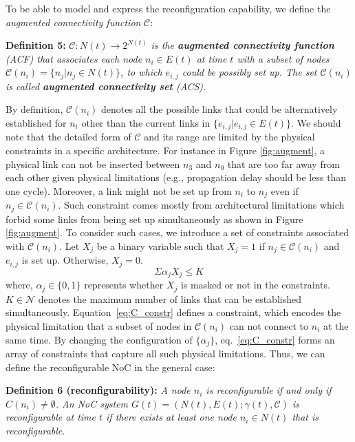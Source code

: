 {{To be able to model and express the reconfiguration capability, we define the \textit{augmented connectivity function} $\mathcal C$:

\noindent \textbf{Definition 5:} \textit{ $\mathcal C: N(t)\rightarrow 2^{N(t)} $ is the \textbf{augmented connectivity function} (ACF) that associates each node $n_{i} \in E(t)$ at time $t$ with a subset of nodes $\mathcal C(n_{i})=\{n_{j}|n_{j} \in N(t)\}$, to which $e_{i,j}$ could be possibly set up. The set $\mathcal C(n_{i})$ is called \textbf{augmented connectivity set} (ACS).}

By definition, $\mathcal C(n_{i})$ denotes all the possible links that could be alternatively established for $n_{i}$ other than the current links in $\{e_{i,j}|e_{i,j} \in E(t)\}$. We should note that the detailed form of $\mathcal C$ and its range are limited by the physical constraints in a specific architecture. For instance in Figure \ref{fig:augment}, a physical link can not be inserted between $n_3$ and $n_0$ that are too far away from each other given physical limitations (e.g., propagation delay should be less than one cycle). Moreover, a link might not be set up from $n_i$ to $n_{j}$ even if $n_{j} \in \mathcal C(n_i)$. Such constraint comes mostly from architectural limitations which forbid some links from being set up simultaneously  as shown in Figure \ref{fig:augment}. To consider such cases, we introduce a set of constraints associated with $\mathcal C(n_i)$. Let $X_{j}$ be a binary variable such that $X_{j}=1$ if $n_{j} \in \mathcal C(n_i)$ and $e_{i,j}$ is set up. Otherwise, $X_{j}=0$.
\begin{equation}\label{eq:C_constr}
\Sigma \alpha_{j}X_{j}\leq K 
\end{equation}
where, $\alpha_{j} \in \{0,1\}$ represents whether $X_{j}$ is masked or not in the constraints. $K \in \mathcal N$ denotes the maximum number of links that can be established simultaneously. Equation~\eqref{eq:C_constr} defines a constraint, which encodes the physical limitation that a subset of nodes in $\mathcal C(n_i)$ can not connect to $n_i$ at the same time. By changing the configuration of $\{\alpha_{j}\}$, eq.~\eqref{eq:C_constr} forms an array of constraints that capture all such physical limitations.  Thus, we can define the reconfigurable NoC in the general case:

\noindent \textbf{Definition 6 (reconfigurability):} \textit{A node $n_{i}$ is reconfigurable if and only if $C(n_i) \neq \emptyset$. An NoC system $G(t)=(N(t),E(t);\gamma(t),\mathcal C)$ is reconfigurable at time $t$ if there exists at least one node $n_i \in N(t) $ that is reconfigurable.}

}}
